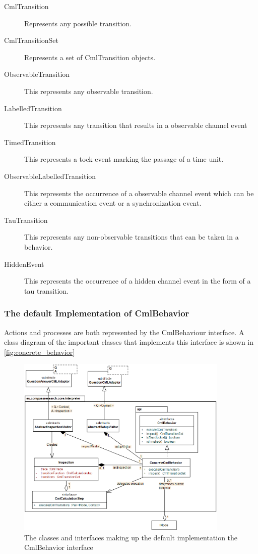 \documentclass[a4paper, 10pt]{include/compassreport}   %
\begin{document}
\begin{description}
\item[CmlTransition] Represents any possible transition.
\item[CmlTransitionSet] Represents a set of CmlTransition objects.  
\item[ObservableTransition] This represents any observable transition.
\item[LabelledTransition] This represents any transition that results
  in a observable channel event
\item[TimedTransition] This represents a tock event marking the
  passage of a time unit.
\item[ObservableLabelledTransition] This represents the occurrence of
  a observable channel event which can be either a communication event
  or a synchronization event.
\item[TauTransition] This represents any non-observable transitions
  that can be taken in a behavior.
\item[HiddenEvent] This represents the occurrence of a hidden
  channel event in the form of a tau transition.
\end{description}

\subsubsection{The default Implementation of CmlBehavior}
\label{sec:action_process_structure}
Actions and processes are both represented by the CmlBehaviour
interface. A class diagram of the important classes that implements
this interface is shown in \autoref{fig:concrete_behavior}
\begin{figure}[ht!]
  \begin{center}
    \includegraphics[width=0.9\textwidth]{figures/defaultCmlBehaviorImpl}
    \caption{The classes and interfaces making up the default implementation the CmlBehavior interface}
    \label{fig:concrete_behavior}
  \end{center}
\end{figure}
\end{document}
